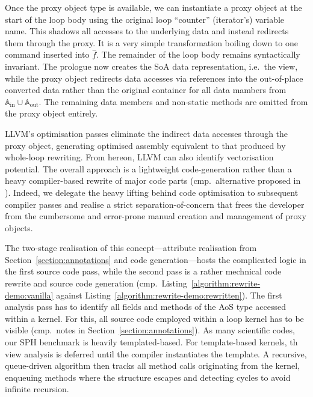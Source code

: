 Once the proxy object type is available, we can instantiate a proxy object at the start of the loop body using the original loop ``counter'' (iterator's) variable name.
This shadows all accesses to the underlying data and instead redirects them through the proxy.
It is a very simple transformation boiling down to one command inserted into $\hat f$.
The remainder of the loop body remains syntactically invariant.
The prologue now creates the SoA data representation, i.e.~the view, while the proxy object redirects data accesses via references into the out-of-place converted data rather than the original container for all data mambers from $\mathbb{A}_{\text{in}} \cup \mathbb{A}_{\text{out}}$. The remaining data members and non-static methods are omitted from the proxy object entirely.


LLVM’s optimisation passes eliminate the indirect data accesses through the proxy object, generating optimised assembly equivalent to that produced by whole-loop rewriting.
From hereon, LLVM can also identify vectorisation potential.
The overall approach is a lightweight code-generation rather than a heavy compiler-based rewrite of major code parts (cmp.~alternative proposed in \cite{Radtke:2024:AoS2SoA}).
Indeed, we delegate the heavy lifting behind code optimisation to subsequent compiler passes and realise a strict separation-of-concern that frees the developer from the cumbersome and error-prone manual creation and management of proxy objects.




The two-stage realisation of this concept---attribute realisation from Section~\ref{section:annotations} and code generation---hosts the complicated logic in the first source code pass, while the second pass is a rather mechnical code rewrite and source code generation (cmp.~Listing~\ref{algorithm:rewrite-demo:vanilla} against Listing~\ref{algorithm:rewrite-demo:rewritten}). 
The first analysis pass has to identify all fields and methods of the AoS type accessed within a kernel. 
For this, all source code employed within a loop kernel has to be visible (cmp.~notes in Section~\ref{section:annotations}).
As many scientific codes, our SPH benchmark is heavily templated-based.
For template-based kernels, th view analysis is deferred until the compiler instantiates the template. 
A recursive, queue-driven algorithm then tracks all method calls originating from the kernel, enqueuing methods where the structure escapes and detecting cycles to avoid infinite recursion. 

